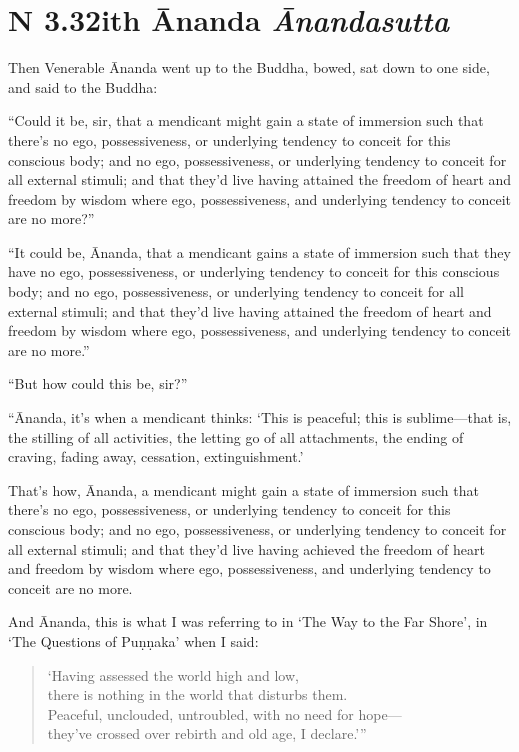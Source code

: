 \documentclass[12pt,openany]{book}%
\newcommand*{\suttatitleacronym}[1]{\smaller[2]{#1}\vspace*{.3em}}
\newcommand*{\suttatitletranslation}[1]{\linebreak{#1}}
\newcommand*{\suttatitleroot}[1]{\linebreak\smaller[2]\itshape{#1}}
\newcommand*{\tocacronym}[1]{\hspace*{-3.3em}{#1}\quad}
\newcommand*{\toctranslation}[1]{#1}
\newcommand*{\tocroot}[1]{(\textit{#1})}
\begin{document}
%
\section*{{\suttatitleacronym AN 3.32}{\suttatitletranslation With Ānanda }{\suttatitleroot Ānandasutta}}
\addcontentsline{toc}{section}{\tocacronym{AN 3.32} \toctranslation{With Ānanda } \tocroot{Ānandasutta}}

Then Venerable Ānanda went up to the Buddha, bowed, sat down to one side, and said to the Buddha: 

“Could it be, sir, that a mendicant might gain a state of immersion such that there’s no ego, possessiveness, or underlying tendency to conceit for this conscious body; and no ego, possessiveness, or underlying tendency to conceit for all external stimuli; and that they’d live having attained the freedom of heart and freedom by wisdom where ego, possessiveness, and underlying tendency to conceit are no more?” 

“It could be, Ānanda, that a mendicant gains a state of immersion such that they have no ego, possessiveness, or underlying tendency to conceit for this conscious body; and no ego, possessiveness, or underlying tendency to conceit for all external stimuli; and that they’d live having attained the freedom of heart and freedom by wisdom where ego, possessiveness, and underlying tendency to conceit are no more.” 

“But how could this be, sir?” 

“Ānanda, it’s when a mendicant thinks: ‘This is peaceful; this is sublime—that is, the stilling of all activities, the letting go of all attachments, the ending of craving, fading away, cessation, extinguishment.’ 

That’s how, Ānanda, a mendicant might gain a state of immersion such that there’s no ego, possessiveness, or underlying tendency to conceit for this conscious body; and no ego, possessiveness, or underlying tendency to conceit for all external stimuli; and that they’d live having achieved the freedom of heart and freedom by wisdom where ego, possessiveness, and underlying tendency to conceit are no more. 

And Ānanda, this is what I was referring to in ‘The Way to the Far Shore’, in ‘The Questions of \textsanskrit{Puṇṇaka}’ when I said: 

\begin{verse}%
‘Having assessed the world high and low, \\
there is nothing in the world that disturbs them. \\
Peaceful, unclouded, untroubled, with no need for hope—\\
they’ve crossed over rebirth and old age, I declare.’” 

%
\end{verse}
\end{document}
